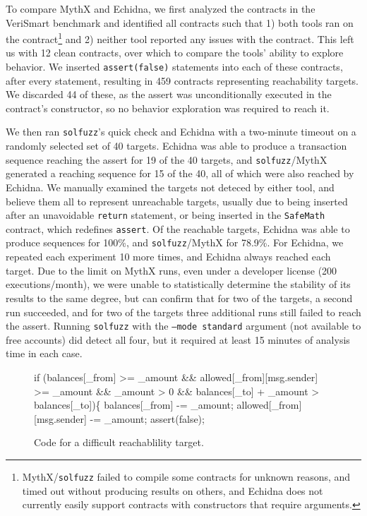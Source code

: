 To compare MythX and Echidna, we first analyzed the contracts in the VeriSmart benchmark \cite{vsbenchmark} and identified all contracts such that 1) both tools ran on the contract\footnote{MythX/{\tt solfuzz} failed to compile some contracts for unknown reasons, and timed out without producing results on others, and Echidna does not currently easily support contracts with constructors that require arguments.} and 2) neither tool reported any issues with the contract.  This left us with 12 clean contracts, over which to compare the tools' ability to explore behavior.  We inserted {\tt assert(false)} statements into each of these contracts, after every statement, resulting in 459 contracts representing reachability targets.  We discarded 44 of these, as the assert was unconditionally executed in the contract's constructor, so no behavior exploration was required to reach it.

We then ran {\tt solfuzz}'s quick check and Echidna with a two-minute timeout on a randomly selected set of 40 targets.  Echidna was able to produce a transaction sequence reaching the assert for 19 of the 40 targets, and {\tt solfuzz}/MythX generated a reaching sequence for 15 of the 40, all of which were also reached by Echidna. We manually examined the targets not deteced by either tool, and believe them all to represent unreachable targets, usually due to being inserted after an unavoidable {\tt return} statement, or being inserted in the {\tt SafeMath} contract, which redefines {\tt assert}.  Of the reachable targets, Echidna was able to produce sequences for 100\%, and {\tt solfuzz}/MythX for 78.9\%.  For Echidna, we repeated each experiment 10 more times, and Echidna always reached each target.  Due to the limit on MythX runs, even under a developer license (200 executions/month), we were unable to statistically determine the stability of its results to the same degree, but can confirm that  for two of the targets, a second run succeeded, and for two of the targets three additional runs still failed to reach the assert.  Running {\tt solfuzz} with the {\tt --mode standard} argument (not available to free accounts) did detect all four, but it required at least 15 minutes of analysis time in each case.

\begin{figure}
  \begin{code}
if (balances[\_from] >= \_amount
  \&\& allowed[\_from][msg.sender] >= \_amount
  \&\& \_amount > 0
  \&\& balances[\_to] + \_amount > balances[\_to])\{
    balances[\_from] -= \_amount;
    allowed[\_from][msg.sender] -= \_amount;
\vspace{0.1in}
    assert(false);
  \end{code}
  \caption{Code for a difficult reachablility target.}
  \label{fig:code}
  \end{figure}

